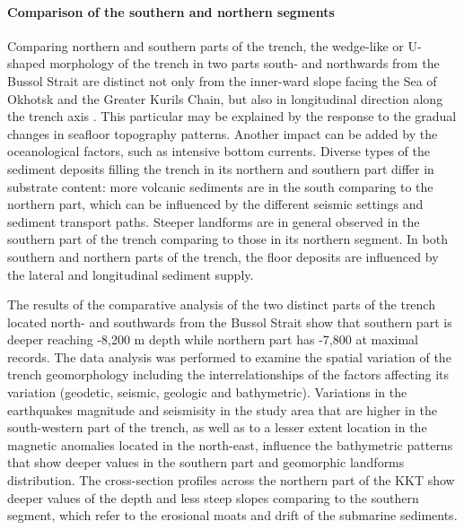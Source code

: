 \documentclass[11pt,a4paper]{report}
\begin{document}
{\paragraph{Comparison of the southern and northern segments}
Comparing northern and southern parts of the trench, the wedge-like or U-shaped morphology of the trench in two parts south- and northwards from the Bussol Strait are distinct not only from the inner-ward slope facing the Sea of Okhotsk and the Greater Kurils Chain, but also in longitudinal direction along the trench axis \cite{Lemenkova202001}. This particular may be explained by the response to the gradual changes in seafloor topography patterns. Another impact can be added by the oceanological factors, such as intensive bottom currents. Diverse types of the sediment deposits filling the trench in its northern and southern part differ in substrate content: more volcanic sediments are in the south comparing to the northern part, which can be influenced by the different seismic settings and sediment transport paths. Steeper landforms are in general observed in the southern part of the trench comparing to those in its northern segment. In both southern and northern parts of the trench, the floor deposits are influenced by the lateral and longitudinal sediment supply.

The results of the comparative analysis of the two distinct parts of the trench located north- and southwards from the Bussol Strait show that southern part is deeper reaching -8,200 m depth while northern part has -7,800 at maximal records. The data analysis was performed to examine the spatial variation of the trench geomorphology including the interrelationships of the factors affecting its variation (geodetic, seismic, geologic and bathymetric). Variations in the earthquakes magnitude and seismisity in the study area that are higher in the south-western part of the trench, as well as to a lesser extent location in the magnetic anomalies located in the north-east, influence the bathymetric patterns that show deeper values in the southern part and geomorphic landforms distribution. The cross-section profiles across the northern part of the \ac{KKT} show deeper values of the depth and less steep slopes comparing to the southern segment, which refer to the erosional moats and drift of the submarine sediments. 

}
\end{document}
